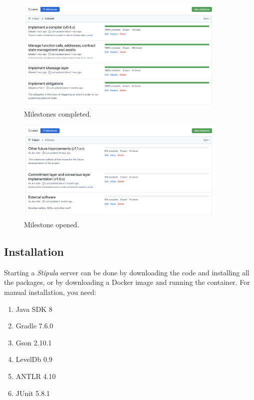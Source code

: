 \begin{figure}[htbp]
	\begin{center}
		\includegraphics[width=0.9\textwidth]{immagini/capitolo-5/milestones-closed.png}
		\caption{Milestones completed.}
		\label{fig:milestones-closed}
	\end{center}
\end{figure}

\begin{figure}[htbp]
	\begin{center}
		\includegraphics[width=0.9\textwidth]{immagini/capitolo-5/milestones-opened.png}
		\caption{Milestone opened.}
		\label{fig:milestones-opened}
	\end{center}
\end{figure}

\subsection{Installation}

Starting a \textit{Stipula} server can be done by downloading the code and installing all the packages, or 
by downloading a Docker image and running the container. For manual installation, you need:
\begin{enumerate}
  \item Java SDK 8
  \item Gradle 7.6.0
  \item Gson 2.10.1 
  \item LevelDb 0.9
  \item ANTLR 4.10
  \item JUnit 5.8.1
\end{enumerate}

